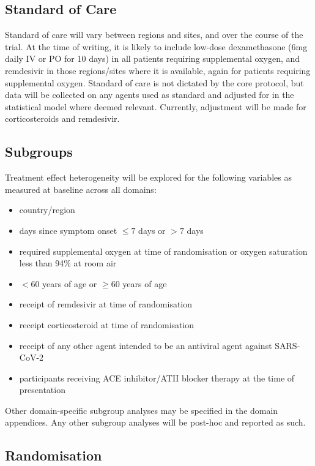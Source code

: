 \documentclass[
  11pt,
]{article}
\providecommand{\tightlist}{%
  \setlength{\itemsep}{0pt}\setlength{\parskip}{0pt}}
\begin{document}
\hypertarget{standard-of-care}{%
\subsection{Standard of Care}\label{standard-of-care}}

Standard of care will vary between regions and sites, and over the course of the trial.
At the time of writing, it is likely to include low-dose dexamethasone (6mg daily IV or PO for 10 days) in all patients requiring supplemental oxygen, and remdesivir in those regions/sites where it is available, again for patients requiring supplemental oxygen.
Standard of care is not dictated by the core protocol, but data will be collected on any agents used as standard and adjusted for in the statistical model where deemed relevant.
Currently, adjustment will be made for corticosteroids and remdesivir.

\hypertarget{subgroups}{%
\subsection{Subgroups}\label{subgroups}}

Treatment effect heterogeneity will be explored for the following variables as measured at baseline across all domains:

\begin{itemize}
\tightlist
\item
  country/region
\item
  days since symptom onset \(\leq 7\) days or \(> 7\) days
\item
  required supplemental oxygen at time of randomisation or oxygen saturation less than 94\% at room air
\item
  \(<60\) years of age or \(\geq 60\) years of age
\item
  receipt of remdesivir at time of randomisation
\item
  receipt corticosteroid at time of randomisation
\item
  receipt of any other agent intended to be an antiviral agent against SARS-CoV-2
\item
  participants receiving ACE inhibitor/ATII blocker therapy at the time of presentation
\end{itemize}

Other domain-specific subgroup analyses may be specified in the domain appendices.
Any other subgroup analyses will be post-hoc and reported as such.

\hypertarget{randomisation}{%
\subsection{Randomisation}\label{randomisation}}
\end{document}

